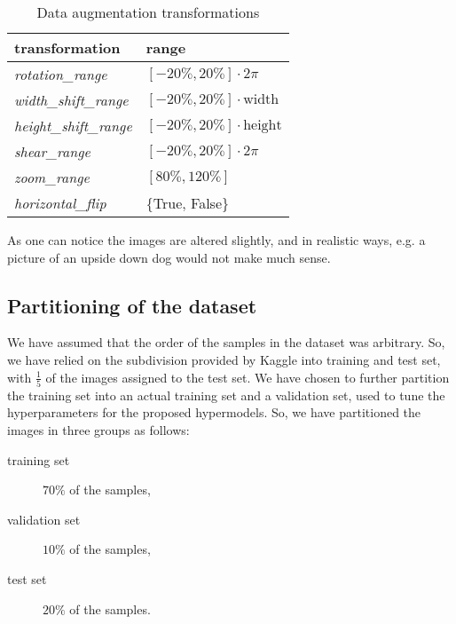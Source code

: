 \begin{table}[h]
    \centering
    \begin{tabular}{ll}
        \textbf{transformation} & \textbf{range} \\
        \midrule
        \textsl{rotation\_range} & $\left[-20\% , 20\%\right]\cdot 2\pi$ \\
        \textsl{width\_shift\_range} & $\left[-20\%, 20\% \right]\cdot \text{width}$ \\
        \textsl{height\_shift\_range} & $\left[-20\%, 20\%\right]\cdot \text{height}$ \\
        \textsl{shear\_range} & $\left[-20\% , 20\%\right]\cdot 2\pi$ \\
        \textsl{zoom\_range} & $\left[80\%, 120\%\right]$ \\
        \textsl{horizontal\_flip} & \{True, False\} \\
    \end{tabular}
    \caption{Data augmentation transformations}
    \label{tab:dataAugmentation}
\end{table}

As one can notice the images are altered slightly, and in realistic ways, e.g. a picture of an upside down dog would not make much sense.

\subsection{Partitioning of the dataset}
We have assumed that the order of the samples in the dataset was arbitrary. So, we have relied on the subdivision provided by Kaggle into training and test set, with $\frac{1}{5}$ of the images assigned to the test set. We have chosen to further partition the training set into an actual training set and a validation set, used to tune the hyperparameters for the proposed hypermodels. So, we have partitioned the images in three groups as follows:
\begin{description}
    \item[training set] $70\%$ of the samples,
    \item[validation set] $10\%$ of the samples,  
    \item[test set] $20\%$ of the samples. 
\end{description}